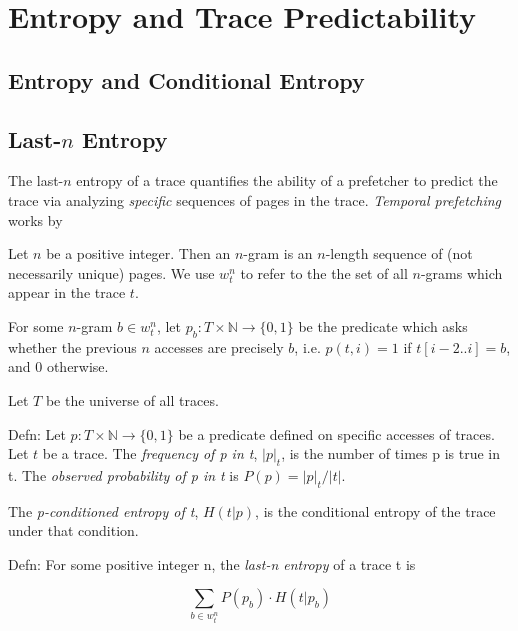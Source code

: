 \section{Entropy and Trace Predictability}

\subsection{Entropy and Conditional Entropy}


\subsection{Last-$n$ Entropy}

The last-$n$ entropy of a trace quantifies the ability of a prefetcher to
predict the trace via analyzing \textit{specific} sequences of pages in the
trace. \textit{Temporal prefetching} works by 

\begin{definition}[$n$-gram] Let $n$ be a positive integer. Then an $n$-gram is
an $n$-length sequence of (not necessarily unique) pages. We use $w_t^n$ to
refer to the the set of all $n$-grams which appear in the trace $t$.
\end{definition}

For some $n$-gram $b\in w^n_t$, let $p_b: T\times\mathbb{N}\rightarrow\{0,1\}$
be the predicate which asks whether the previous $n$ accesses are precisely $b$,
i.e. $p(t, i) = 1$ if $t[i-2..i] = b$, and $0$ otherwise.

Let $T$ be the universe of all traces.


Defn: Let $p: T\times\mathbb{N} \rightarrow \{0,1\}$ be a predicate defined on
specific accesses of traces. Let $t$ be a trace. The \textit{frequency of p in t},
$|p|_t$, is the number of times p is true in t. The \textit{observed probability of p
in t} is $P(p) = |p|_t / |t|$.



The \textit{p-conditioned entropy of t}, $H(t|p)$, is the conditional entropy of the
trace under that condition.

Defn: For some positive integer n, the \textit{last-n entropy} of a trace t is

$$
\sum_{b \in w^n_t} P(p_b) \cdot H(t | p_b)
$$

